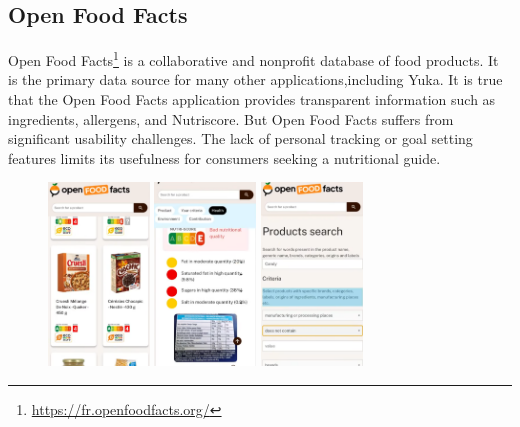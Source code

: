\subsection{Open Food Facts}
Open Food Facts\footnote{\url{https://fr.openfoodfacts.org/}} is a collaborative and nonprofit database of food
products. It is the primary data source for many other applications,including Yuka. It is true that the Open Food Facts application provides transparent
information such as ingredients, allergens, and Nutriscore. But Open Food Facts suffers
from significant usability challenges. The lack of personal tracking or goal
setting features limits its usefulness for consumers seeking a nutritional
guide.
\begin{figure}[H]
    \centering
    \includegraphics[width=0.24\textwidth]{images/OFF-00.png}
    \includegraphics[width=0.24\textwidth]{images/OFF-01.png}
    \includegraphics[width=0.24\textwidth]{images/OFF-02.png}

\end{figure}
